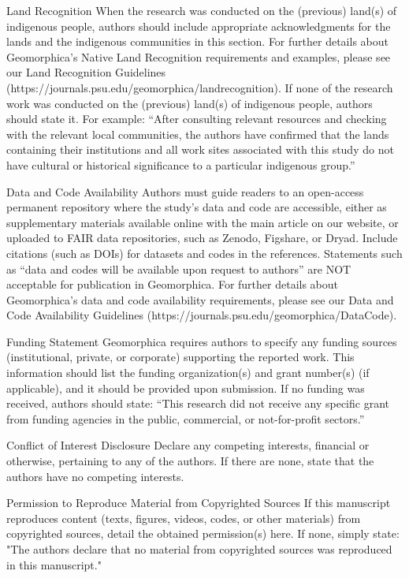 \documentclass[titlepage]{geomorphica}
\begin{document}
\begin{closing}{Land Recognition}
	When the research was conducted on the (previous) land(s) of indigenous people, authors should include appropriate acknowledgments for the lands and the indigenous communities in this section. For further details about Geomorphica’s Native Land Recognition requirements and examples, please see our Land Recognition Guidelines (https://journals.psu.edu/geomorphica/landrecognition).
If none of the research work was conducted on the (previous) land(s) of indigenous people, authors should state it. For example:
“After consulting relevant resources and checking with the relevant local communities, the authors have confirmed that the lands containing their institutions and all work sites associated with this study do not have cultural or historical significance to a particular indigenous group.”
\end{closing}
\begin{closing}{Data and Code Availability}
	Authors must guide readers to an open-access permanent repository where the study's data and code are accessible, either as supplementary materials available online with the main article on our website, or uploaded to FAIR data repositories, such as Zenodo, Figshare, or Dryad. Include citations (such as DOIs) for datasets and codes in the references. Statements such as “data and codes will be available upon request to authors” are NOT acceptable for publication in Geomorphica.
For further details about Geomorphica’s data and code availability requirements, please see our Data and Code Availability Guidelines (https://journals.psu.edu/geomorphica/DataCode).
\end{closing}
\begin{closing}{Funding Statement}
	Geomorphica requires authors to specify any funding sources (institutional, private, or corporate) supporting the reported work. This information should list the funding organization(s) and grant number(s) (if applicable), and it should be provided upon submission. If no funding was received, authors should state: “This research did not receive any specific grant from funding agencies in the public, commercial, or not-for-profit sectors.”
\end{closing}
\begin{closing}{Conflict of Interest Disclosure}
	Declare any competing interests, financial or otherwise, pertaining to any of the authors. If there are none, state that the authors have no competing interests.
\end{closing}
\begin{closing}{Permission to Reproduce Material from Copyrighted Sources}
	If this manuscript reproduces content (texts, figures, videos, codes, or other materials) from copyrighted sources, detail the obtained permission(s) here. If none, simply state: "The authors declare that no material from copyrighted sources was reproduced in this manuscript."
\end{closing}
\end{document}
